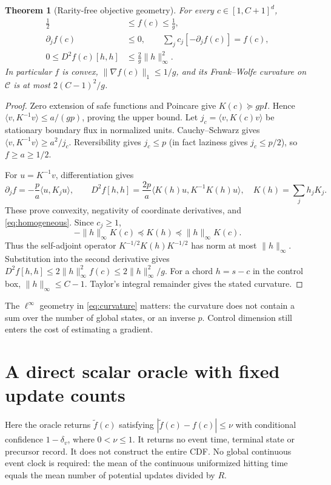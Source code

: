 \documentclass[11pt]{article}
\newtheorem{theorem}{Theorem}
\newcommand{\calC}{\mathcal C}
\begin{document}
\begin{theorem}[Rarity-free objective geometry]
For every $c\in[1,C+1]^d$,
\begin{align}
 \frac12&\le f(c)\le\frac1g,\label{eq:bounds}\\
 \partial_j f(c)&\le0,\qquad
 \sum_j c_j[-\partial_j f(c)]=f(c),\label{eq:homogeneous}\\
 0\le D^2f(c)[h,h]&\le\frac{2}{g}\|h\|_\infty^2.
 \label{eq:curvature}
\end{align}
In particular $f$ is convex, $\|\nabla f(c)\|_1\le1/g$, and its
Frank--Wolfe curvature on $\calC$ is at most
$2(C-1)^2/g$.
\end{theorem}
\begin{proof}
Zero extension of safe functions and Poincare give
$K(c)\succeq gpI$. Hence
$\langle v,K^{-1}v\rangle\le a/(gp)$, proving the upper bound.
Let $j_c=\langle v,K(c)v\rangle$ be stationary boundary flux in
normalized units. Cauchy--Schwarz gives
$\langle v,K^{-1}v\rangle\ge a^2/j_c$. Reversibility gives
$j_c\le p$ (in fact laziness gives $j_c\le p/2$), so $f\ge a\ge1/2$.

For $u=K^{-1}v$, differentiation gives
\[
 \partial_j f=-\frac pa\langle u,K_ju\rangle,
 \qquad
 D^2f[h,h]=\frac{2p}{a}\langle K(h)u,K^{-1}K(h)u\rangle,
 \quad K(h)=\sum_jh_jK_j.
\]
These prove convexity, negativity of coordinate derivatives, and
\eqref{eq:homogeneous}. Since $c_j\ge1$,
\[
 -\|h\|_\infty K(c)\preceq K(h)\preceq
 \|h\|_\infty K(c).
\]
Thus the self-adjoint operator $K^{-1/2}K(h)K^{-1/2}$ has norm at most
$\|h\|_\infty$. Substitution into the second derivative gives
$D^2f[h,h]\le2\|h\|_\infty^2 f(c)\le2\|h\|_\infty^2/g$.
For a chord $h=s-c$ in the control box, $\|h\|_\infty\le C-1$.
Taylor's integral remainder gives the stated curvature.
\end{proof}

The $\ell^\infty$ geometry in \eqref{eq:curvature} matters: the curvature
does not contain a sum over the number of global states, or an inverse
$p$. Control dimension still enters the cost of estimating a gradient.

\section{A direct scalar oracle with fixed update counts}
\label{sec:oracle}
Here the oracle returns $\widetilde f(c)$ satisfying
$|\widetilde f(c)-f(c)|\le\nu$ with conditional confidence $1-\delta_v$,
where $0<\nu\le1$. It returns no event time, terminal state or precursor
record. It does not construct the entire CDF. No global continuous
event clock is required: the mean of the continuous uniformized hitting
time equals the mean number of potential updates divided by $R$.
\end{document}
